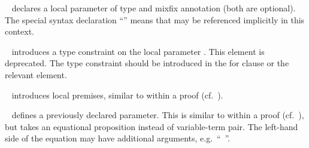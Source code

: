 \begin{isabellebody}
\begin{isamarkuptext}
\begin{description}
\begin{description}
  \item \hyperlink{element.fixes}{\mbox{}}~ declares a local
  parameter of type  and mixfix annotation  (both
  are optional).  The special syntax declaration ``'' means that  may be referenced
  implicitly in this context.

  \item \hyperlink{element.constrains}{\mbox{}}~ introduces a type
  constraint  on the local parameter .  This
  element is deprecated.  The type constraint should be introduced in
  the for clause or the relevant \hyperlink{element.fixes}{\mbox{}} element.

  \item \hyperlink{element.assumes}{\mbox{}}~
  introduces local premises, similar to \hyperlink{command.assume}{\mbox{}} within a
  proof (cf.\ ).

  \item \hyperlink{element.defines}{\mbox{}}~ defines a previously
  declared parameter.  This is similar to \hyperlink{command.def}{\mbox{}} within a
  proof (cf.\ ), but \hyperlink{element.defines}{\mbox{}}
  takes an equational proposition instead of variable-term pair.  The
  left-hand side of the equation may have additional arguments, e.g.\
  ``\hyperlink{element.defines}{\mbox{}}~''.


\end{description}
\end{description}
\end{isamarkuptext}
\end{isabellebody}
